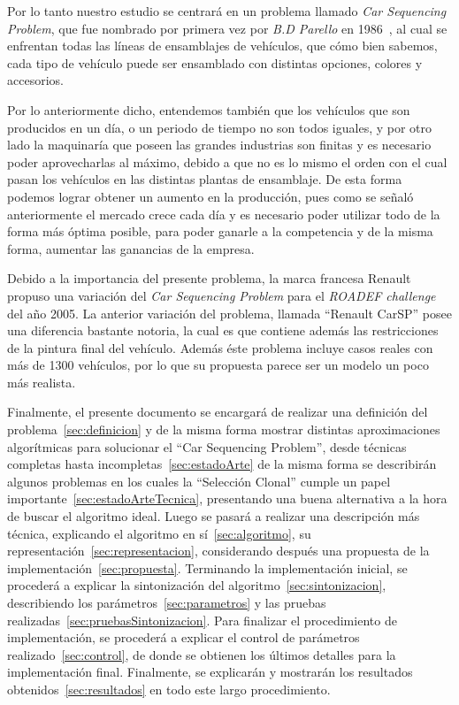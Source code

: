 Por lo tanto nuestro estudio se centrará en un problema llamado \emph{Car Sequencing Problem},
que fue nombrado por primera vez por \emph{B.D Parello} en 1986~\cite{parello}, al cual se enfrentan
todas las líneas de ensamblajes de vehículos, que cómo bien sabemos, cada tipo de vehículo puede ser ensamblado
con distintas opciones, colores y accesorios.

Por lo anteriormente dicho, entendemos también que los vehículos que son producidos en un día,
o un periodo de tiempo no son todos iguales, y por otro lado la maquinaría que poseen las grandes industrias son
finitas y es necesario poder aprovecharlas al máximo, debido a que no es lo mismo el orden con el cual pasan
los vehículos en las distintas plantas de ensamblaje.
De esta forma podemos lograr obtener un aumento en la producción, pues como
se señaló anteriormente el mercado crece cada día y es necesario poder utilizar todo de la forma
más óptima posible, para poder ganarle a la competencia y de la misma forma, aumentar las ganancias
de la empresa.

Debido a la importancia del presente problema, la marca francesa Renault propuso una variación del \emph{Car Sequencing Problem}
para el \emph{ROADEF challenge} del año 2005. La anterior variación del problema, llamada ``Renault CarSP'' posee una
diferencia bastante notoria, la cual es que contiene además las restricciones de la pintura final del vehículo.
Además éste problema incluye casos reales con más de 1300 vehículos, por lo que su propuesta parece ser un modelo un poco
más realista.

Finalmente, el presente documento se encargará de realizar una definición del problema~\ref{sec:definicion}
y de la misma forma mostrar distintas aproximaciones algorítmicas para solucionar el ``Car Sequencing Problem'',
desde técnicas completas hasta incompletas~\ref{sec:estadoArte} de la misma forma se describirán algunos
problemas en los cuales la ``Selección Clonal'' cumple un papel importante~\ref{sec:estadoArteTecnica},
 presentando una buena alternativa a la hora de buscar el algoritmo ideal. Luego se pasará a realizar una
descripción más técnica, explicando el algoritmo en sí~\ref{sec:algoritmo}, su representación~\ref{sec:representacion},
considerando después una propuesta de la implementación~\ref{sec:propuesta}.
Terminando la implementación inicial, se procederá a explicar la sintonización del algoritmo~\ref{sec:sintonizacion},
describiendo los parámetros~\ref{sec:parametros} y las pruebas realizadas~\ref{sec:pruebasSintonizacion}.
Para finalizar el procedimiento de implementación, se procederá a explicar el control de parámetros realizado~\ref{sec:control},
de donde se obtienen los últimos detalles para la implementación final.
Finalmente, se explicarán y mostrarán los resultados obtenidos~\ref{sec:resultados} en todo este largo procedimiento.
